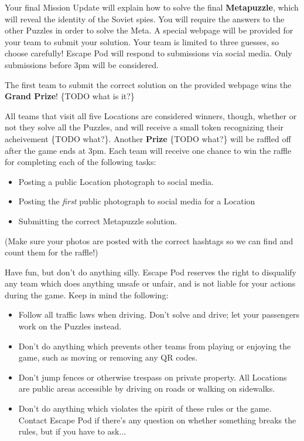 \documentclass{puzzlehunt}
\begin{document}

Your final Mission Update will explain how to solve the final
\textbf{Metapuzzle}, which will reveal the identity of the Soviet spies.
You will require the answers to the other Puzzles in order to solve the Meta.
A special webpage will be provided for your team to submit your solution. Your
team is limited to three guesses, so choose carefully! Escape Pod will respond
to submissions via social media. Only submissions before 3pm will be considered.


The first team to submit the correct solution on the provided webpage wins the
\textbf{Grand Prize}! \{TODO what is it?\}

All teams that visit all five Locations are considered winners, though, whether
or not they solve all the Puzzles, and will receive a small token recognizing
their acheivement \{TODO what?\}. Another \textbf{Prize} \{TODO what?\} will be
raffled off after the game ends at 3pm. Each team will receive one chance to
win the raffle for completing each of the following tasks:

\begin{itemize}
  \item Posting a public Location photograph to social media.
  \item Posting the \textit{first} public photograph to social media for a Location
  \item Submitting the correct Metapuzzle solution.
\end{itemize}

(Make sure your photos are posted with the correct hashtags so we can find
and count them for the raffle!)


Have fun, but don't do anything silly. Escape Pod reserves the right to
disqualify any team which does anything unsafe or unfair, and is not liable
for your actions during the game. Keep in mind the following:

\begin{itemize}
  \item Follow all traffic laws when driving. Don't solve and drive; let your
    passengers work on the Puzzles instead.
  \item Don't do anything which prevents other teams from playing or enjoying
    the game, such as moving or removing any QR codes.
  \item Don't jump fences or otherwise trespass on private property. All
    Locations are public areas accessible by driving on roads or walking on
    sidewalks.
  \item Don't do anything which violates the spirit of these rules or the game.
    Contact Escape Pod if there's any question on whether something breaks
    the rules, but if you have to ask...
\end{itemize}
\end{document}

